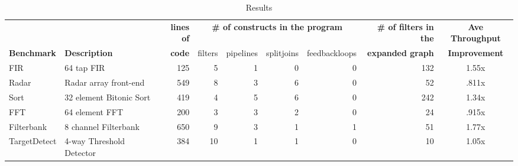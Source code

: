 \begin{table*}[t]
\vspace{-4pt}
\begin{center}
\scriptsize
\begin{tabular}{|l|l||r||r|r|r|r||r||c||} \hline
 & & {\bf lines of} & \multicolumn{4}{|c||}{\bf \# of constructs in the program} & {\bf \# of filters in the} & {\bf Ave Throughput}\\ \cline{4-7}
{\bf Benchmark} & {\bf Description} & {\bf code} & filters & pipelines & splitjoins & feedbackloops & {\bf expanded graph} & {\bf Improvement}
\\
\hline \hline
FIR & 64 tap FIR & 
125 & 5 & 1 & 0 & 0 & 132 & 1.55x
\\ \hline
Radar & Radar array front-end\cite{pca} & 
549 & 8 & 3 & 6 & 0 & 52 & .811x
\\ \hline
Sort & 32 element Bitonic Sort & 
419 & 4 & 5 & 6 & 0 & 242 & 1.34x
\\  \hline
FFT & 64 element FFT & 
200 & 3 & 3 & 2 & 0 & 24 & .915x
\\  \hline
Filterbank & 8 channel Filterbank & 
650 & 9 & 3 & 1 & 1 & 51 & 1.77x
\\  \hline
TargetDetect & 4-way Threshold Detector & 
384 & 10 & 1 & 1 & 0 & 10 & 1.05x
\\  \hline
\end{tabular}
\vspace{-6pt}
\caption{\protect\small Results}
\label{tab:benchmarks}
\vspace{-10pt}
\end{center}
\end{table*}
